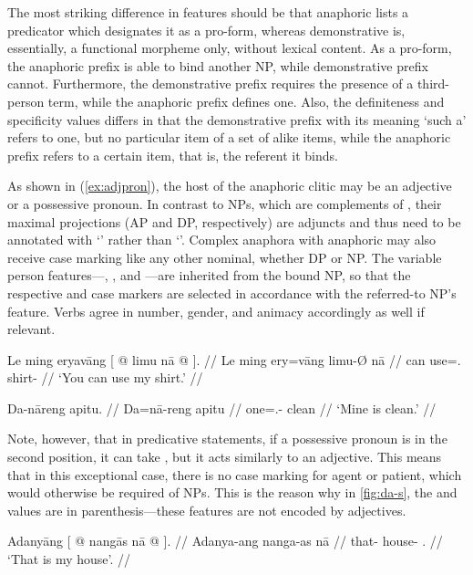 The most striking difference in features should be that anaphoric 
 lists a predicator which designates it as a pro-form, whereas
demonstrative  is, essentially, a functional morpheme only, 
without lexical content. As a pro-form, the anaphoric prefix is able to
bind another NP, while demonstrative prefix cannot. Furthermore, the 
demonstrative prefix requires the presence of a third-person term, while the
anaphoric prefix defines one. Also, the definiteness and specificity values 
differs in that the demonstrative prefix with its meaning `such a' refers to
one, but no particular item of a set of alike items, while the anaphoric prefix 
refers to a certain item, that is, the referent it binds.

As shown in (\ref{ex:adjpron}), the host of the anaphoric  clitic
may be an adjective or a possessive pronoun. In contrast to NPs, which are
complements of , their maximal projections (AP and DP, respectively)
are adjuncts and thus need to be annotated with `\pass{\Adj}' rather than 
`\updown{}'. Complex anaphora with anaphoric  may also receive
case marking like any other nominal, whether DP or NP. The variable person
features---\Num{}, \Gend{}, and \Anim{}---are inherited from the bound NP, so
that the respective \Aarg{} and \Parg{} case markers are selected in accordance
with the referred-to NP's \Anim{} feature. Verbs agree in number, gender, and
animacy accordingly as well if relevant.

\pex
\a\begingl
	\gla Le ming eryavāng {\normalfont [} @ limu nā @ 
			{\normalfont ]}. //
	\glb Le ming ery=vāng {} limu-Ø nā {} //
	\glc \PatTI{} can use=\Second{}.\Aarg{} {} shirt-\Top{} {} //
	\glft `You can use my shirt.' //
\endgl

\a\begingl
	\gla Da-nāreng apitu. //
	\glb Da=nā-reng apitu //
	\glc one=\Fsg{}.\Gen{}-\AargI{} clean //
	\glft `Mine is clean.' //
\endgl

\xe

Note, however, that in predicative statements, if a possessive pronoun is in the
second position, it can take , but it acts similarly to an
adjective. This means that in this exceptional case, there is no case marking
for agent or patient, which would otherwise be required of NPs. This is the 
reason why in \autoref{fig:da-s}, the \Pers{} and \Def{} values are in 
parenthesis---these features are not encoded by adjectives.

\pex
\a\begingl
	\gla Adanyāng {\normalfont [} @ nangās nā @ 
		{\normalfont ]}. //
	\glb Adanya-ang {} nanga-as nā {} //
	\glc that-\Aarg{} {} house-\Parg{} \Fsg{}.\Gen{} {} //
	\glft `That is my house'. //
\endgl

